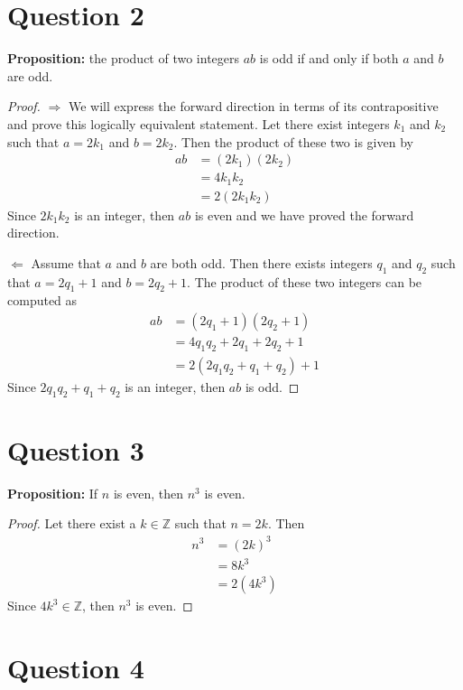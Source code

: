 \documentclass[11pt, oneside]{article}   	%
\begin{document}
\section*{Question 2}

\textbf{Proposition:} the product of two integers $ab$ is odd if and only if both $a$ and $b$ are odd.

\begin{proof}
$\Rightarrow$ We will express the forward direction in terms of its contrapositive  and prove this logically equivalent statement. Let there exist integers $k_1$ and $k_2$ such that $a=2k_1$ and $b=2k_2$. Then the product of these two is given by
\begin{align*}
    	ab & = (2k_1)(2k_2) \\
    	& = 4k_1k_2 \\
    	& = 2(2k_1k_2)
\end{align*}
Since $2k_1k_2$ is an integer, then $ab$ is even and we have proved the forward direction.

$\Leftarrow$ Assume that $a$ and $b$ are both odd. Then there exists integers $q_1$ and $q_2$ such that $a=2q_1+1$ and $b=2q_2+1$. The product of these two integers can be computed as
\begin{align*}
    	ab & = (2q_1+1)(2q_2+1) \\
    	& = 4q_1q_2 + 2q_1 + 2q_2 + 1 \\
    	& = 2(2q_1q_2 + q_1 + q_2) + 1
\end{align*}
Since $2q_1q_2 + q_1 + q_2$ is an integer, then $ab$ is odd.
\end{proof}

\section*{Question 3}

\textbf{Proposition:} If $n$ is even, then $n^3$ is even.

\begin{proof}
Let there exist a $k \in \mathbb{Z}$ such that $n=2k$. Then
\begin{align*}
	n^3 & = (2k)^3 \\
	& = 8k^3 \\
	& = 2(4k^3)
\end{align*}
Since $4k^3 \in \mathbb{Z}$, then $n^3$ is even.
\end{proof}


\section*{Question 4}
\end{document}
